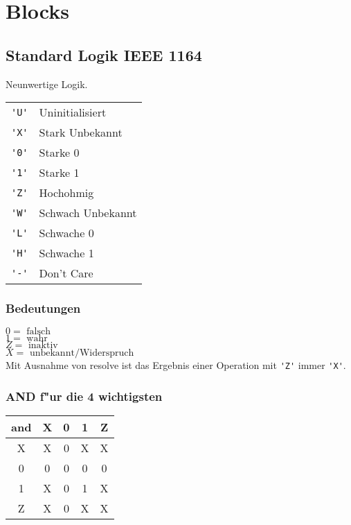 \documentclass[german, 10pt, a4paper, twocolumn]{scrartcl}
\theoremstyle{definition}
\begin{document}
\section{Blocks}

\subsection{Standard Logik IEEE 1164}

Neunwertige Logik.\\

\begin{tabular}{cl}
	\verb#'U'# &	Uninitialisiert\\
	\verb#'X'# &	Stark Unbekannt\\
	\verb#'0'# &	Starke 0\\
	\verb#'1'# &	Starke 1\\
	\verb#'Z'# &	Hochohmig\\
	\verb#'W'# &	Schwach Unbekannt\\
	\verb#'L'# &	Schwache 0\\
	\verb#'H'# &	Schwache 1\\
	\verb#'-'# &	Don't Care
\end{tabular}

\subsubsection{Bedeutungen}

$0 = \mbox{ falsch}$\\
$1 = \mbox{ wahr}$\\
$Z = \mbox{ inaktiv}$\\
$X = \mbox{ unbekannt/Widerspruch}$\\

Mit Ausnahme von resolve ist das Ergebnis einer Operation mit \verb#'Z'# immer \verb#'X'#.

\subsubsection{AND f"ur die 4 wichtigsten}

\begin{tabular}{c|cccc}
	and &	X &	0 &	1 &	Z\\\hline
	X &	X &	0 &	X &	X\\
	0 &	0 &	0 &	0 &	0\\
	1 &	X &	0 &	1 &	X\\
	Z &	X &	0 &	X &	X
\end{tabular}
\end{document}

